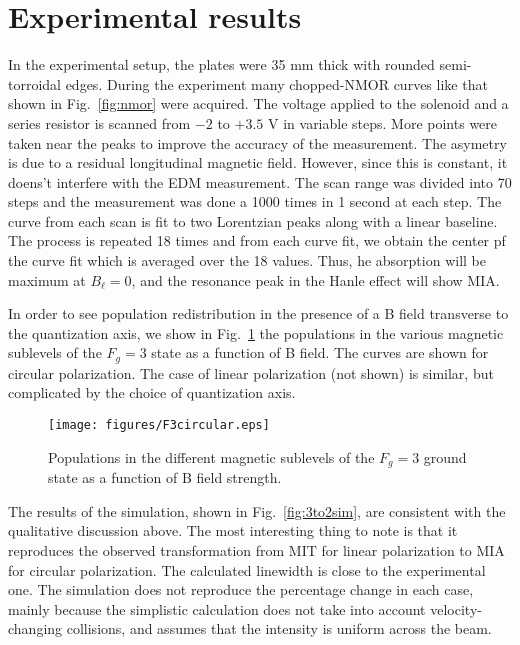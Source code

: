 \section{Experimental results}

In the experimental setup, the plates were 35 mm thick with rounded semi-torroidal edges. During the experiment many chopped-NMOR curves like that shown in Fig.\ \ref{fig:nmor} were acquired. The voltage applied to the solenoid and a series resistor  is scanned from $ -2 $ to $ +3.5 $ V in variable steps. More points were taken near the peaks to improve the accuracy of the measurement. The asymetry is due to a residual longitudinal magnetic field. However, since this is constant, it doens't interfere with the EDM measurement. The scan range was divided into 70 steps and the measurement was done a 1000 times in 1 second at each step. The curve from each scan is fit to two Lorentzian peaks along with a linear baseline. The process is repeated 18 times and from each curve fit, we obtain the center pf the curve fit which is averaged over the 18 values. Thus, 
he absorption will be maximum at $ B_{\ell} =0 $, and the resonance peak in the Hanle effect will show MIA.

In order to see population redistribution in the presence of a B field transverse to the quantization axis, we show in Fig.~\ref{fig:F3circular} the populations in the various magnetic sublevels of the $F_g = 3 $ state as a function of B field. The curves are shown for circular polarization. The case of linear polarization (not shown) is similar, but complicated by the choice of quantization axis.

\begin{figure}
	\centering
	\texttt{[image: figures/F3circular.eps]}
	\caption{Populations in the different magnetic sublevels of the $F_g = 3 $ ground state as a function of B field strength.}
	\label{fig:F3circular}
\end{figure}

The results of the simulation, shown in Fig.\ \ref{fig:3to2sim}, are consistent with the qualitative discussion above. The most interesting thing to note is that it reproduces the observed transformation from MIT for linear polarization to MIA for circular polarization. The calculated linewidth is close to the experimental one. The simulation does not reproduce the percentage change in each case, mainly because the simplistic calculation does not take into account velocity-changing collisions, and assumes that the intensity is uniform across the beam.

